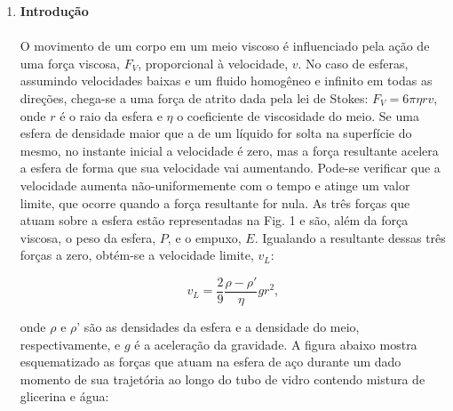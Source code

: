 \documentclass[a4paper, 11pt]{article}
\begin{document}


	\begin{enumerate}
	
	\item \textbf{Introdução}
\paragraph{}
O movimento de um corpo em um meio viscoso é influenciado pela ação de uma força viscosa, $F_V$, proporcional à velocidade, $v$. No caso de esferas, assumindo velocidades baixas e um fluido homogêneo e infinito em todas as direções, chega-se a uma força de atrito dada pela lei de Stokes: $F_V = 6 \pi \eta rv$, onde $r$ é o raio da esfera e $\eta$ o coeficiente de viscosidade do meio. Se uma esfera de densidade maior que a de um líquido for solta na superfície do mesmo, no instante inicial a velocidade é zero, mas a força resultante acelera a esfera de forma que sua velocidade vai aumentando. Pode-se verificar que a velocidade aumenta não-uniformemente com o tempo e atinge um valor limite, que ocorre quando a força resultante for nula. As três forças que atuam sobre a esfera estão representadas na Fig. 1 e são, além da força viscosa, o peso da esfera, $P$, e o empuxo, $E$. Igualando a resultante dessas três forças a zero, obtém-se a velocidade limite, $v_L$:

$$ v_L = \dfrac{2}{9} \dfrac{\rho - \rho'}{\eta} g r^2 , $$

onde $\rho$ e $\rho’$ são as densidades da esfera e a densidade do meio, respectivamente, e $g$ é a aceleração da gravidade. A figura abaixo mostra esquematizado as forças que atuam na esfera de aço durante um dado momento de sua trajetória ao longo do tubo de vidro contendo mistura de glicerina e água:


\end{enumerate}
\end{document}

